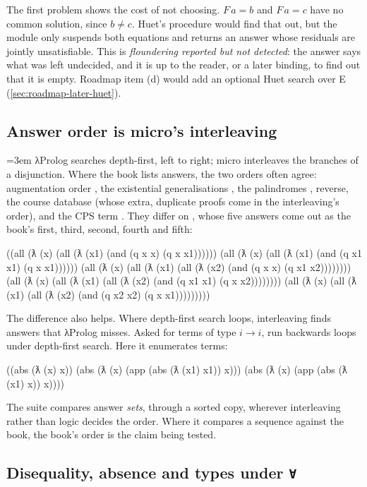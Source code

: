 The first problem shows the cost of not choosing. $F\,a=b$ and $F\,a=c$ have no common solution, since
$b\ne c$. Huet's procedure would find that out, but the module only suspends both equations and returns
an answer whose residuals are jointly unsatisfiable. This is \emph{floundering reported but not detected}:
the answer says what was left undecided, and it is up to the reader, or a later binding, to find out that
it is empty. Roadmap item (d) would add an optional Huet search over E (\cref{sec:roadmap-later-huet}).

\subsection{Answer order is micro's interleaving}\label{sec:roadmap-lim-order}

{\emergencystretch=3em
λProlog searches depth-first, left to right; micro interleaves the branches of a disjunction. Where the
book lists answers, the two orders often agree: augmentation order , the existential
generalisations , the palindromes , reverse, the course database (whose extra,
duplicate proofs come in the interleaving's order), and the CPS term
. They differ on , whose five answers  come out as the book's first,
third, second, fourth and fifth:\par}
\begin{answers}
((all (ƛ (x) (all (ƛ (x1) (and (q x x) (q x x1))))))
 (all (ƛ (x) (all (ƛ (x1) (and (q x1 x1) (q x x1))))))
 (all (ƛ (x) (all (ƛ (x1) (all (ƛ (x2) (and (q x x) (q x1 x2))))))))
 (all (ƛ (x) (all (ƛ (x1) (all (ƛ (x2) (and (q x1 x1) (q x x2))))))))
 (all (ƛ (x) (all (ƛ (x1) (all (ƛ (x2) (and (q x2 x2) (q x x1)))))))))
\end{answers}
The difference also helps. Where depth-first search loops, interleaving finds answers that λProlog misses.
Asked for terms of type $i\to i$,  run backwards loops under depth-first search. Here it
enumerates terms:
\begin{answers}
((abs (ƛ (x) x))
 (abs (ƛ (x) (app (abs (ƛ (x1) x1)) x)))
 (abs (ƛ (x) (app (abs (ƛ (x1) x)) x))))
\end{answers}
The suite compares answer \emph{sets}, through a sorted copy, wherever interleaving rather than logic
decides the order. Where it compares a sequence against the book, the book's order is the claim being tested.

\subsection{Disequality, absence and types under \texttt{∀}}\label{sec:roadmap-lim-readings}

